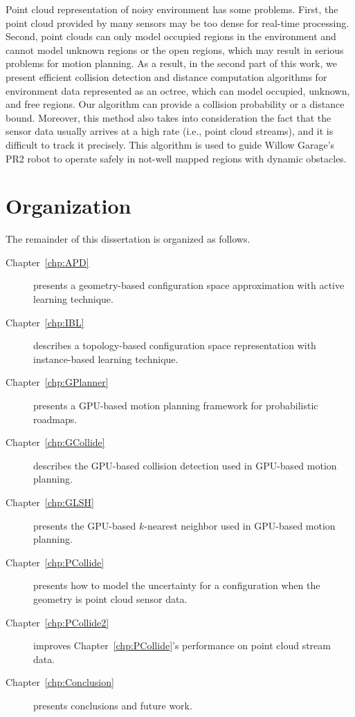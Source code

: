 Point cloud representation of noisy environment has some problems. First, the point cloud provided by many
sensors may be too dense for real-time processing. Second, point clouds can only model occupied
regions in the environment and cannot model unknown regions or the open regions, which may result in serious
problems for motion planning. As a result, in the second part of this work, we present efficient collision detection and
distance computation algorithms for environment data represented as an octree, which can model occupied,
unknown, and free regions. Our algorithm can provide a collision probability or a distance bound. Moreover,
this method also takes into consideration the fact that the sensor data usually arrives at a high rate (i.e., point cloud streams), and it is
difficult to track it precisely. This algorithm is used to guide Willow Garage's PR2 robot to operate safely in
not-well mapped regions with dynamic obstacles.

\section{Organization}
The remainder of this dissertation is organized as follows.

 \begin{description}
 \item[Chapter~\ref{chp:APD}] presents a geometry-based configuration space approximation with active learning technique.
 \item[Chapter~\ref{chp:IBL}] describes a topology-based configuration space representation with instance-based learning technique.
 \item[Chapter~\ref{chp:GPlanner}] presents a GPU-based motion planning framework for probabilistic roadmaps.
 \item[Chapter~\ref{chp:GCollide}] describes the GPU-based collision detection used in GPU-based motion planning.
 \item[Chapter~\ref{chp:GLSH}] presents the GPU-based $k$-nearest neighbor used in GPU-based motion planning.
 \item[Chapter~\ref{chp:PCollide}] presents how to model the uncertainty for a configuration when the geometry is point cloud sensor data.
 \item[Chapter~\ref{chp:PCollide2}] improves Chapter~\ref{chp:PCollide}'s performance on point cloud stream data.
 \item[Chapter~\ref{chp:Conclusion}] presents conclusions and future work.
 \end{description}


